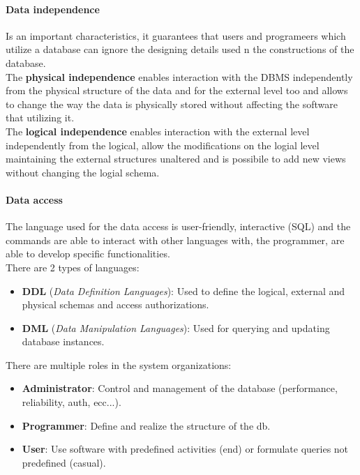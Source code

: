 \documentclass[12pt]{article}
\begin{document}
\paragraph{Data independence}
Is an important characteristics, it guarantees that users and programeers which utilize a database can ignore the designing details used n the constructions of the database.\\
The \textbf{physical independence} enables interaction with the DBMS independently from the physical structure of the data and for the external level too and allows to change the way the data is physically stored without affecting the software that utilizing it.\\
The \textbf{logical independence} enables interaction with the external level independently from the logical, allow the modifications on the logial level maintaining the external structures unaltered and is possibile to add new views without changing the logial schema.

\paragraph{Data access}
The language used for the data access is user-friendly, interactive (SQL) and the commands are able to interact with other languages with, the programmer, are able to develop specific functionalities.\\
There are 2 types of languages:
\begin{itemize}
  \item \textbf{DDL} (\textit{Data Definition Languages}): Used to define the logical, external and physical schemas and access authorizations.
  \item \textbf{DML} (\textit{Data Manipulation Languages}): Used for querying and updating database instances.
\end{itemize}

\noindent There are multiple roles in the system organizations:
\begin{itemize}
  \item \textbf{Administrator}: Control and management of the database (performance, reliability, auth, ecc...).
  \item \textbf{Programmer}: Define and realize the structure of the db.
  \item \textbf{User}: Use software with predefined activities (end) or formulate queries not predefined (casual).
\end{itemize}
\end{document}
